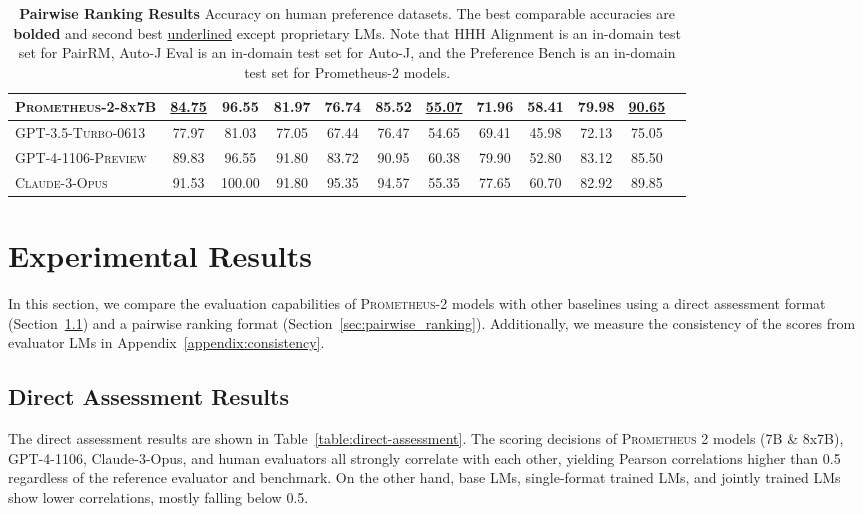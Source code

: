\documentclass[11pt]{article}
\begin{document}
\begin{table}[t!]
{\begin{tabular}{lccccccccccc}
    \textsc{Prometheus-2-8x7B}&\underline{84.75}&\textbf{96.55}&\textbf{81.97}&76.74&\textbf{85.52}&\underline{55.07}&\textbf{71.96}&\textbf{58.41}&\textbf{79.98} & \underline{90.65}\\
    \midrule
    \textsc{GPT-3.5-Turbo-0613}&77.97&81.03&77.05&67.44&76.47&54.65&69.41&45.98&72.13 & 75.05\\
    \textsc{GPT-4-1106-Preview}&89.83&96.55&91.80&83.72&90.95&60.38&79.90&52.80&83.12 & 85.50\\
    \textsc{Claude-3-Opus}&91.53&100.00&91.80& 95.35&94.57&55.35&77.65&60.70&82.92&89.85\\
    \bottomrule    
\end{tabular}}
\caption{\footnotesize \textbf{Pairwise Ranking Results} Accuracy on human preference datasets. The best comparable accuracies are \textbf{bolded} and second best \underline{underlined} except proprietary LMs. Note that HHH Alignment is an in-domain test set for PairRM, Auto-J Eval is an in-domain test set for Auto-J, and the Preference Bench is an in-domain test set for Prometheus-2 models.}
\label{table:pairwise-ranking}
\end{table}  










\section{Experimental Results}\label{experimental_results}

In this section, we compare the evaluation capabilities of \textsc{Prometheus-2} models with other baselines using a direct assessment format (Section~\ref{sec:direct_assessment}) and a pairwise ranking format (Section~\ref{sec:pairwise_ranking}). Additionally, we measure the consistency of the scores from evaluator LMs in Appendix~\ref{appendix:consistency}.

\subsection{Direct Assessment Results}\label{sec:direct_assessment} 
The direct assessment results are shown in Table~\ref{table:direct-assessment}. The scoring decisions of \textsc{Prometheus 2} models (7B \& 8x7B), GPT-4-1106, Claude-3-Opus, and human evaluators all strongly correlate with each other, yielding Pearson correlations higher than 0.5 regardless of the reference evaluator and benchmark. On the other hand, base LMs, single-format trained LMs, and jointly trained LMs show lower correlations, mostly falling below 0.5.
\end{document}
